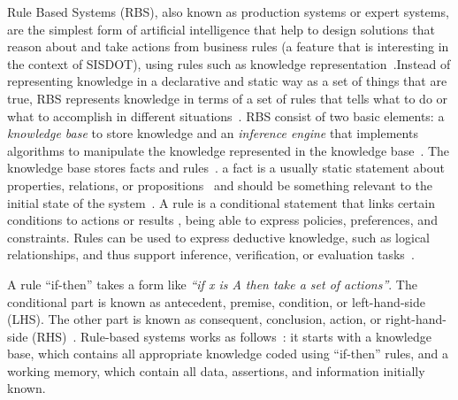 
Rule Based Systems (RBS), also known as production systems or expert systems, are the 
simplest form of artificial intelligence that help to design solutions that reason about 
and take actions from business rules (a feature that is interesting in the context of SISDOT), using rules such as knowledge representation~\cite{grosan2011}.Instead of representing knowledge in a declarative and static way as a set of things that are true, 
RBS represents knowledge in terms of a set of rules that tells what to do or what to accomplish in different 
situations~\cite{grosan2011}. 
RBS consist of two basic elements: a \emph{knowledge base} to store knowledge and an \emph{inference engine} 
that implements  algorithms to manipulate the knowledge represented in the 
knowledge base~\cite{grosan2011,DBLP:books/daglib/0070547,gallacher1989}.
The knowledge base stores facts and rules~\cite{DBLP:journals/cacm/Hayes-Roth85}. a fact is a usually static statement about properties, relations, 
or propositions~\cite{DBLP:journals/cacm/Hayes-Roth85} and should be something relevant to the initial state of the system~\cite{grosan2011}. 
A rule is a conditional statement that links certain conditions to actions or results \cite{abraham2005}, being able to express 
policies, preferences, and constraints. Rules can be used to express deductive knowledge, 
such as logical relationships, and thus support inference, verification, or evaluation tasks~\cite{DBLP:journals/cacm/Hayes-Roth85}.

A rule ``if-then'' takes a form like \emph{``if x is A then take a set of actions''}. 
The conditional part is known as antecedent, premise, condition, or left-hand-side (LHS). The other part 
is known as consequent, conclusion, action, or right-hand-side (RHS)~\cite{grosan2011,abraham2005}. 
Rule-based systems works as follows~\cite{grosan2011}: it starts with a knowledge base, 
which contains all appropriate knowledge coded using ``if-then'' rules, and a working memory, 
which contain all data, assertions, and information initially known. 

